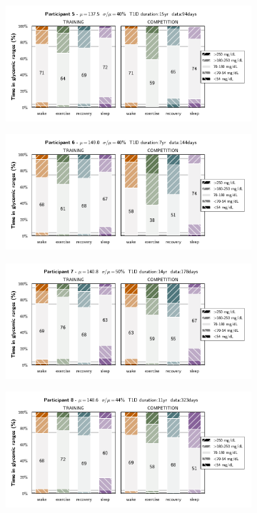\documentclass[11pt,a4paper]{article}
\begin{document}
\begin{figure}\ContinuedFloat
    \centering
    \begin{subfigure}{\textwidth}
        \centering
        \includegraphics[width=.75\textwidth]{figure/time_in_zone/time_in_glucoselevel_traincomp_5.pdf}
    \end{subfigure}\vfill
    \begin{subfigure}{\textwidth}
        \centering
        \includegraphics[width=.75\textwidth]{figure/time_in_zone/time_in_glucoselevel_traincomp_6.pdf}
    \end{subfigure}\vfill
    \begin{subfigure}{\textwidth}
        \centering
        \includegraphics[width=.75\textwidth]{figure/time_in_zone/time_in_glucoselevel_traincomp_7.pdf}
    \end{subfigure}\vfill
    \begin{subfigure}{\textwidth}
        \centering
        \includegraphics[width=.75\textwidth]{figure/time_in_zone/time_in_glucoselevel_traincomp_8.pdf}
    \end{subfigure}\vfill
\end{figure}
\end{document}

